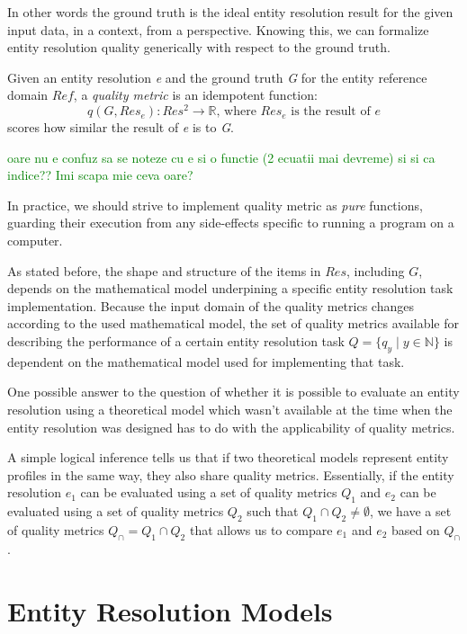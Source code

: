\documentclass[journal]{IEEEtran}
\begin{document}
    In other words the ground truth is the ideal entity resolution result for 
    the given input data, in a context, from a perspective.
    Knowing this, we can formalize entity resolution quality generically with
    respect to the ground truth.
    
    \begin{defn}
    Given an entity resolution \textit{e} and the ground truth \textit{G} for
    the entity reference domain $Ref$, a \textit{quality metric} is an
    idempotent function:
    \[
        q(G, Res_e): Res^2 \rightarrow \mathbb{R}\textrm{, where
        }Res_e\textrm{ is the result of }e
    \]
    scores how similar the result of \textit{e} is to \textit{G}.
    \end{defn}
    \textcolor{green}{oare nu e confuz sa se noteze cu e si o functie (2 ecuatii mai devreme) si si ca indice?? Imi scapa mie ceva oare?}

    In practice, we should strive to implement quality metric as \textit{pure}
    functions, guarding their execution from any side-effects specific to
    running a program on a computer.

    As stated before, the shape and structure of the items in $Res$, including
    $G$, depends on the mathematical model underpining a specific entity
    resolution task implementation.
    Because the input domain of the quality metrics changes according to the
    used mathematical model, the set of quality metrics available for describing
    the performance of a certain entity resolution task $Q = \{q_y \mid y \in
    \mathbb{N}\}$ is dependent on the mathematical model used for implementing
    that task.

    One possible answer to the question of whether it is possible to evaluate
    an entity resolution using a theoretical model which wasn't available at the
    time when the entity resolution was designed has to do with the
    applicability of quality metrics.

    A simple logical inference tells us that if two theoretical models represent
    entity profiles in the same way, they also share quality metrics.
    Essentially, if the entity resolution $e_1$ can be evaluated using a set of
    quality metrics $Q_1$ and $e_2$ can be evaluated using a set of quality
    metrics $Q_2$ such that $Q_1 \cap Q_2 \neq \emptyset$, we have a set of
    quality metrics $Q_\cap = Q_1 \cap Q_2$ that allows us to compare $e_1$ and
    $e_2$ based on $Q_\cap$.
    
    \section[models]{Entity Resolution Models}\label{sec:models}
\end{document}
